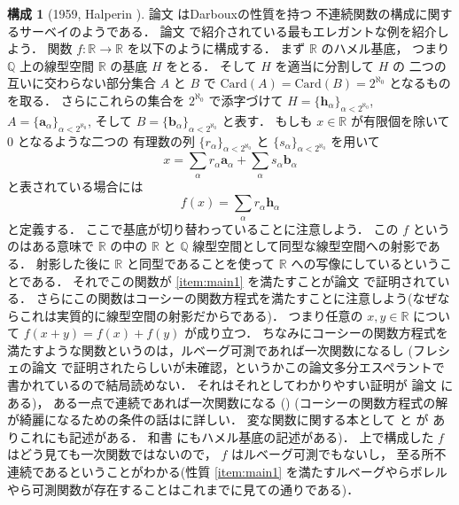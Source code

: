 \documentclass[leqno, a4paper, 12pt]{jsarticle}
\theoremstyle{definition}
\newtheorem{con}[thm]{構成}
\newcommand{\qq}{\mathbb{Q}}
\newcommand{\rr}{\mathbb{R}}
\newcommand{\card}{\mathrm{Card}}
\newcommand{\myco}{2^{\aleph_{0}}}
\newcommand{\myhv}{\boldsymbol{h}}
\newcommand{\myav}{\boldsymbol{a}}
\newcommand{\mybv}{\boldsymbol{b}}
\begin{document}
\begin{con}[1959, Halperin \cite{MR0104770}]\label{con:hal}
論文\cite{MR0104770}
はDarbouxの性質を持つ
不連続関数の構成に関するサーベイのようである．
論文\cite{MR0104770}
で紹介されている最もエレガントな例を紹介しよう．
関数
$f\colon \rr\to \rr$
を以下のように構成する．
まず
$\rr$
のハメル基底，
つまり
$\qq$
上の線型空間
$\rr$
の基底
$H$
をとる．
そして
$H$
を適当に分割して
$H$
の
二つの互いに交わらない部分集合
$A$
と
$B$
で
$\card(A)=\card(B)=\myco$
となるものを取る．
さらにこれらの集合を
$\myco$
で添字づけて
$H=\{\myhv_{\alpha}\}_{\alpha<\myco}$, 
$A=\{\myav_{\alpha}\}_{\alpha<\myco}$, 
そして
$B=\{\mybv_{\alpha}\}_{\alpha<\myco}$
と表す．
もしも
$x\in \rr$
が有限個を除いて
$0$
となるような二つの
有理数の列
$\{r_{\alpha}\}_{\alpha<\myco}$
と
$\{s_{\alpha}\}_{\alpha<\myco}$
を用いて
\[
x=\sum_{\alpha}r_{\alpha}\myav_{\alpha}
+\sum_{\alpha}s_{\alpha}\mybv_{\alpha}
\]
と表されている場合には
\[
f(x)=\sum_{\alpha}r_{\alpha}\myhv_{\alpha}
\]
と定義する．
ここで基底が切り替わっていることに注意しよう．
この
$f$
というのはある意味で
$\rr$
の中の
$\rr$
と
$\qq$
線型空間として同型な線型空間への射影である．
射影した後に
$\rr$
と同型であることを使って
$\rr$
への写像にしているということである．
それでこの関数が
\ref{item:main1}
を満たすことが論文
\cite{MR0104770}
で証明されている．
さらにこの関数はコーシーの関数方程式を満たすことに注意しよう(なぜならこれは実質的に線型空間の射影だからである)．
つまり任意の
$x, y\in \rr$
について
$f(x+y)=f(x)+f(y)$
が成り立つ．
ちなみにコーシーの関数方程式を満たすような関数というのは，ルベーグ可測であれば一次関数になるし
(フレシェの論文
\cite{frechet1913pri}で証明されたらしいが未確認，というかこの論文多分エスペラントで書かれているので結局読めない．
それはそれとしてわかりやすい証明が
論文
\cite{alexiewicz1945remarque}
にある)，
ある一点で連続であれば一次関数になる
(\cite{darboux1875composition})
(コーシーの関数方程式の解が綺麗になるための条件の話は\cite[第２章, 2.2]{wa1}に詳しい．
変な関数に関する本として
\cite{MR2067444}
と
\cite{MR3645463}
が
ありこれにも記述がある．
和書\cite{wa3}
にもハメル基底の記述がある)．
上で構成した
$f$
はどう見ても一次関数ではないので，
$f$
はルベーグ可測でもないし，
至る所不連続であるということがわかる(性質
\ref{item:main1}
を満たすルベーグやらボレルやら可測関数が存在することはこれまでに見ての通りである)．
\end{con}
\end{document}
